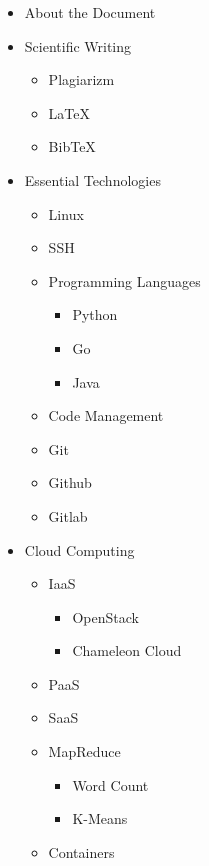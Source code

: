\begin{itemize}
\item About the Document
\item Scientific Writing

  \begin{itemize}
  \tightlist
  \item   Plagiarizm
  \item   LaTeX
  \item   BibTeX
  \end{itemize}
\item Essential Technologies

  \begin{itemize}
  \item   Linux
  \item   SSH
  \item   Programming Languages

    \begin{itemize}
    \tightlist
    \item     Python
    \item     Go
    \item     Java
    \end{itemize}
  \item   Code Management
  \item   Git
  \item   Github
  \item   Gitlab
  \end{itemize}
\item Cloud Computing

  \begin{itemize}
  \item   IaaS

    \begin{itemize}
    \item     OpenStack
    \item     Chameleon Cloud
    \end{itemize}
  \item   PaaS
  \item   SaaS
  \item   MapReduce

    \begin{itemize}
    \tightlist
    \item     Word Count
    \item     K-Means
    \end{itemize}
  \item   Containers


\end{itemize}
\end{itemize}
